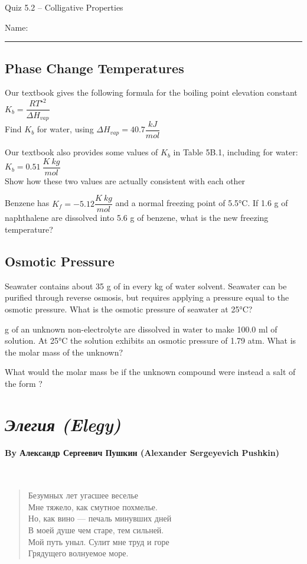\documentclass[11pt, letterpaper]{memoir}
\begin{document}
	\begin{center}
		{\large Quiz 5.2 -- Colligative Properties}
	\end{center}
	{\large Name: \rule[-1mm]{4in}{.1pt} 
		
\subsection*{Phase Change Temperatures}
Our textbook gives the following formula for the boiling point elevation constant $K_b=\dfrac{RT^{\star 2}}{\Delta H_{vap}}$
\\ Find $K_b$ for water, using $\Delta H_{vap} = 40.7\dfrac{kJ}{mol}$

\vspace{4em}
\noindent Our textbook also provides some values of $K_b$ in Table 5B.1, including for water: $K_b=0.51~\dfrac{K~kg}{mol}$
\\ Show how these two values are actually consistent with each other

\vspace{4em}
\noindent Benzene has $K_f=-5.12\dfrac{K~kg}{mol}$ and a normal freezing point of 5.5°C. If 1.6 g of naphthalene are dissolved into 5.6 g of benzene, what is the new freezing temperature?

\vspace{4em}
\subsection*{Osmotic Pressure}
Seawater contains about 35 g of  in every kg of water solvent. Seawater can be purified through reverse osmosis, but requires applying a pressure equal to the osmotic pressure. What is the osmotic pressure of seawater at 25°C?

\vspace{4em}
 g of an unknown non-electrolyte are dissolved in water to make 100.0 ml of solution. At 25°C the solution exhibits an osmotic pressure of 1.79 atm. What is the molar mass of the unknown?

\vspace{4em}
\noindent What would the molar mass be if the unknown compound were instead a salt of the form ?

\newpage
\pagestyle{empty}
\addtocounter{page}{-1}
\section*{\emph{Элегия (Elegy)}}
\paragraph{By Александр Сергеевич Пушкин (Alexander Sergeyevich Pushkin)}~
\begin{verse}
	Безумных лет угасшее веселье\\
	Мне тяжело, как смутное похмелье.\\
	Но, как вино — печаль минувших дней\\
	В моей душе чем старе, тем сильней.\\
	Мой путь уныл. Сулит мне труд и горе\\
	Грядущего волнуемое море.
	

\end{verse}}
\end{document}
